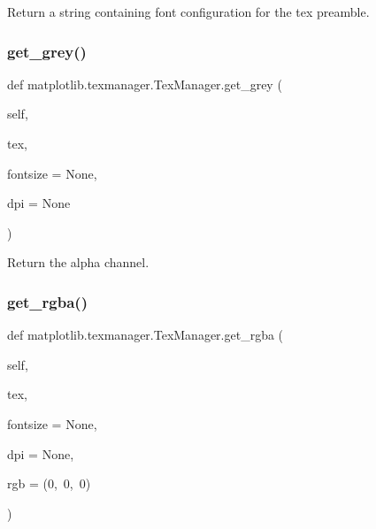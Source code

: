 \begin{DoxyVerb}Return a string containing font configuration for the tex preamble.
\end{DoxyVerb}
 \mbox{\label{classmatplotlib_1_1texmanager_1_1TexManager_a53f29971a9643757fed98688b5eeeafc}} 
\subsubsection{\texorpdfstring{get\+\_\+grey()}{get\_grey()}}
{\footnotesize\ttfamily def matplotlib.\+texmanager.\+Tex\+Manager.\+get\+\_\+grey (\begin{DoxyParamCaption}\item[{}]{self,  }\item[{}]{tex,  }\item[{}]{fontsize = {\ttfamily None},  }\item[{}]{dpi = {\ttfamily None} }\end{DoxyParamCaption})}

\begin{DoxyVerb}Return the alpha channel.\end{DoxyVerb}
 \mbox{\label{classmatplotlib_1_1texmanager_1_1TexManager_af115a6c2dbf3e3141600aacace3350fa}} 
\subsubsection{\texorpdfstring{get\+\_\+rgba()}{get\_rgba()}}
{\footnotesize\ttfamily def matplotlib.\+texmanager.\+Tex\+Manager.\+get\+\_\+rgba (\begin{DoxyParamCaption}\item[{}]{self,  }\item[{}]{tex,  }\item[{}]{fontsize = {\ttfamily None},  }\item[{}]{dpi = {\ttfamily None},  }\item[{}]{rgb = {\ttfamily (0,~0,~0)} }\end{DoxyParamCaption})}

